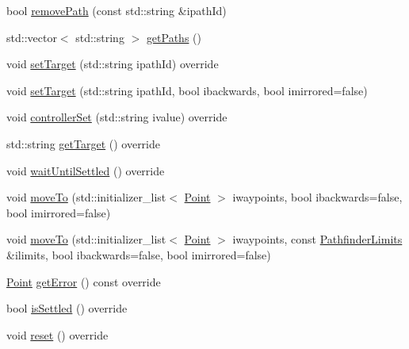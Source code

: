 \begin{DoxyCompactItemize}
\item 
bool \mbox{\hyperlink{classokapi_1_1AsyncMotionProfileController_a6c6a889067dbb3a54c33f829b3aa1246}{remove\+Path}} (const std\+::string \&ipath\+Id)
\item 
std\+::vector$<$ std\+::string $>$ \mbox{\hyperlink{classokapi_1_1AsyncMotionProfileController_a5853ae5af552cf56f36c9563733c6ace}{get\+Paths}} ()
\item 
void \mbox{\hyperlink{classokapi_1_1AsyncMotionProfileController_adf705d6bfd3d0a83d8a6c50a05ffd156}{set\+Target}} (std\+::string ipath\+Id) override
\item 
void \mbox{\hyperlink{classokapi_1_1AsyncMotionProfileController_a2846d2e36b86b39aa2e761e4e34cd225}{set\+Target}} (std\+::string ipath\+Id, bool ibackwards, bool imirrored=false)
\item 
void \mbox{\hyperlink{classokapi_1_1AsyncMotionProfileController_a292b22f53ed0ef67a479e00c92f68e3f}{controller\+Set}} (std\+::string ivalue) override
\item 
std\+::string \mbox{\hyperlink{classokapi_1_1AsyncMotionProfileController_a9f9e44e987481619cbec37d5e35c71e8}{get\+Target}} () override
\item 
void \mbox{\hyperlink{classokapi_1_1AsyncMotionProfileController_a0b08d2f39d786739a734c50523db1eb2}{wait\+Until\+Settled}} () override
\item 
void \mbox{\hyperlink{classokapi_1_1AsyncMotionProfileController_ab467935f98d48fdcaca047b1994b8597}{move\+To}} (std\+::initializer\+\_\+list$<$ \mbox{\hyperlink{structokapi_1_1Point}{Point}} $>$ iwaypoints, bool ibackwards=false, bool imirrored=false)
\item 
void \mbox{\hyperlink{classokapi_1_1AsyncMotionProfileController_a95fc55789adfe0c760e9fd6c758f810a}{move\+To}} (std\+::initializer\+\_\+list$<$ \mbox{\hyperlink{structokapi_1_1Point}{Point}} $>$ iwaypoints, const \mbox{\hyperlink{structokapi_1_1PathfinderLimits}{Pathfinder\+Limits}} \&ilimits, bool ibackwards=false, bool imirrored=false)
\item 
\mbox{\hyperlink{structokapi_1_1Point}{Point}} \mbox{\hyperlink{classokapi_1_1AsyncMotionProfileController_aeb60fb677877b3461c1232dda7d0db50}{get\+Error}} () const override
\item 
bool \mbox{\hyperlink{classokapi_1_1AsyncMotionProfileController_abfc944ba6d703dc1aa6fb16a44b5e395}{is\+Settled}} () override
\item 
void \mbox{\hyperlink{classokapi_1_1AsyncMotionProfileController_a9ad15272defac4db5e2b318671eb3850}{reset}} () override

\end{DoxyCompactItemize}
